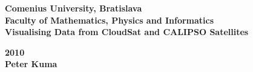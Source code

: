\begin{titlepage}
\pagestyle{empty}
\centering\LARGE\bfseries Comenius University, Bratislava\\Faculty of Mathematics, Physics and Informatics\\[6cm]
\centering\huge\mdseries Visualising Data from CloudSat and CALIPSO Satellites\\
\vfill
\raggedright\large\bfseries 2010\\[0.5cm]
\centering\large\bfseries Peter Kuma
\end{titlepage}